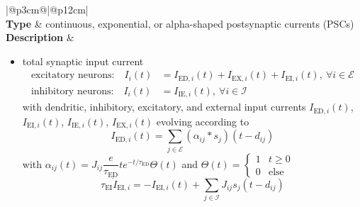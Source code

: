 \documentclass[10pt,a4paper,twoside,american]{article}
\newcommand{\Epop}{\mathcal{E}} %
\newcommand{\Ipop}{\mathcal{I}} %
\begin{document}

\begin{table}[ht!]
  \small
  \begin{tabular}{|@{\hspace*{1mm}}p{3cm}@{}|@{\hspace*{1mm}}p{12cm}|}
  \hline
  \\
  \hline
  \textbf{Type} & continuous, exponential, or alpha-shaped postsynaptic currents (PSCs) \\
  \hline
  \textbf{Description} &                 
    \begin{itemize}
      \item  total synaptic input current
      \begin{equation}
        \label{eq:all_curr}
        \begin{aligned}
          \text{excitatory neurons:}\quad I_i(t) &= I_{\text{ED},i}(t) + I_{\text{EX},i}(t) + I_{\text{EI},i}(t) ,\ \forall i\in\Epop \\
          \text{inhibitory neurons:}\quad I_i(t) &= I_{\text{IE},i}(t) ,\ \forall i\in\Ipop
        \end{aligned}
      \end{equation}
      with dendritic, inhibitory, excitatory, and external input currents $I_{\text{ED},i}(t)$,  $I_{\text{EI},i}(t)$, $I_{\text{IE},i}(t)$, $I_{\text{EX},i}(t)$ evolving according to
      \begin{equation}
        \label{eq:dendritic_current}
          I_{\text{ED},i}(t)=\sum_{j\in\Epop}(\alpha_{ij}*s_j)(t-d_{ij})
    \end{equation}
    \qquad with $\alpha_{ij}(t)=J_{ij} \dfrac{e}{\tau_{\text{ED}}} t e^{-t/\tau_{\text{ED}}} \Theta(t)$
    and
    $
    \Theta(t)=
    \begin{cases}1 & t \ge 0 \\ 0 & \text{else} \end{cases}
    $
    \begin{equation}
      \label{eq:EI_current}
      \tau_\text{EI}\dot{I}_{\text{EI},i} = -I_{\text{EI},i}(t) + \sum_{j\in\Ipop} J_{ij} s_j(t-d_{ij})

\end{equation}
\end{itemize}
\end{tabular}
\end{table}
\end{document}
